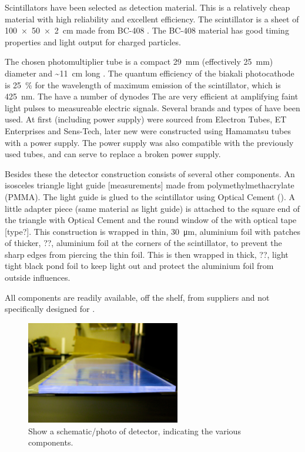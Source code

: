 Scintillators have been selected as detection material. This is a relatively cheap material with high reliability and excellent efficiency. The scintillator is a sheet of \SI[product-units=power]{100 x 50 x 2}{\centi\meter} made from BC-408 \cite{bc408}. The BC-408 material has good timing properties and light output for charged particles.

The chosen photomultiplier tube \cite{et:pmt} is a compact \SI{29}{\milli\meter} (effectively \SI{25}{\milli\meter}) diameter and \SI{~11}{\centi\meter} long \pmt. The quantum efficiency of the biakali photocathode is \SI{25}{\percent} for the wavelength of maximum emission of the scintillator, which is \SI{425}{\nano\meter}. The \pmts have a number of dynodes The \pmts are very efficient at amplifying faint light pulses to measureable electric signals. Several brands and types of \pmts have been used. At first \pmts (including power supply) were sourced from Electron Tubes, ET Enterprises and Sens-Tech, later new \pmts were constructed using Hamamatsu tubes with a \nikhef power supply. The \nikhef power supply was also compatible with the previously used tubes, and can serve to replace a broken power supply.

Besides these the detector construction consists of several other components. An isosceles triangle light guide [measurements] made from polymethylmethacrylate (PMMA). The light guide is glued to the scintillator using Optical Cement (\cite{bc600}). A little adapter piece (same material as light guide) is attached to the square end of the triangle with Optical Cement and the round window of the \pmt with optical tape [type?]. This construction is wrapped in thin, \SI{30}{\micro\meter}, aluminium foil with patches of thicker, ??, aluminium foil at the corners of the scintillator, to prevent the sharp edges from piercing the thin foil. This is then wrapped in thick, ??, light tight black pond foil to keep light out and protect the aluminium foil from outside influences.

All components are readily available, off the shelf, from suppliers and not specifically designed for \hisparc.

\begin{figure}
    \centering
    \includegraphics[width=0.6\textwidth]
                    {plots/experiment/ADL_115651.jpg}
    \caption{Show a schematic/photo of detector, indicating the various components.}
    \label{fig:schematic_detector}
\end{figure}

